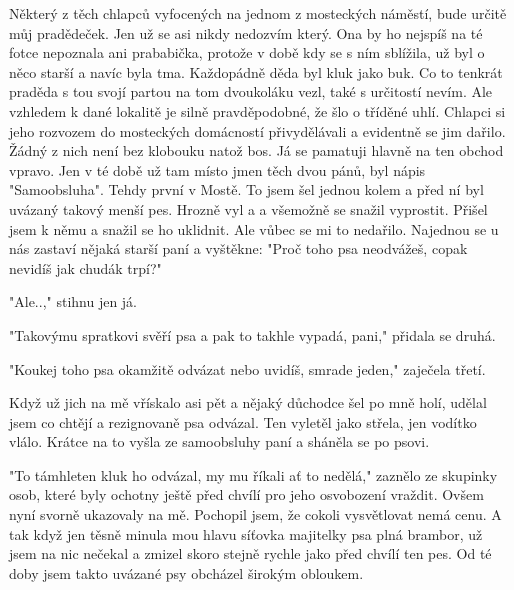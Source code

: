 
Některý z těch chlapců vyfocených na jednom z mosteckých náměstí, bude
určitě můj pradědeček. Jen už se asi nikdy nedozvím který. Ona by ho
nejspíš na té fotce nepoznala ani prababička, protože v době kdy se s
ním sblížila, už byl o něco starší a navíc byla tma. Každopádně děda
byl kluk jako buk. Co to tenkrát praděda s tou svojí partou na tom
dvoukoláku vezl, také s určitostí nevím. Ale vzhledem k dané lokalitě
je silně pravděpodobné, že šlo o tříděné uhlí. Chlapci si jeho
rozvozem do mosteckých domácností přivydělávali a evidentně se jim
dařilo. Žádný z nich není bez klobouku natož bos. Já se pamatuji
hlavně na ten obchod vpravo. Jen v té době už tam místo jmen těch dvou
pánů, byl nápis "Samoobsluha". Tehdy první v Mostě. To jsem šel jednou
kolem a před ní byl uvázaný takový menší pes. Hrozně vyl a a všemožně
se snažil vyprostit. Přišel jsem k němu a snažil se ho uklidnit. Ale
vůbec se mi to nedařilo. Najednou se u nás zastaví nějaká starší paní
a vyštěkne: "Proč toho psa neodvážeš, copak nevidíš jak chudák trpí?"

"Ale..," stihnu jen já.

"Takovýmu spratkovi svěří psa a pak to takhle vypadá, pani," přidala
se druhá.

"Koukej toho psa okamžitě odvázat nebo uvidíš, smrade jeden," zaječela
třetí.

Když už jich na mě vřískalo asi pět a nějaký důchodce šel po mně holí,
udělal jsem co chtějí a rezignovaně psa odvázal. Ten vyletěl jako
střela, jen vodítko vlálo. Krátce na to vyšla ze samoobsluhy paní a
sháněla se po psovi.

"To támhleten kluk ho odvázal, my mu říkali ať to nedělá," zaznělo ze
skupinky osob, které byly ochotny ještě před chvílí pro jeho
osvobození vraždit. Ovšem nyní svorně ukazovaly na mě. Pochopil jsem,
že cokoli vysvětlovat nemá cenu. A tak když jen těsně minula mou hlavu
síťovka majitelky psa plná brambor, už jsem na nic nečekal a zmizel
skoro stejně rychle jako před chvílí ten pes. Od té doby jsem takto
uvázané psy obcházel širokým obloukem.


